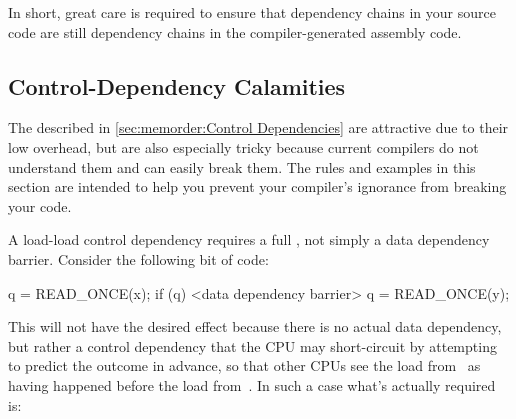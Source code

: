 \QuickQuizEnd

In short, great care is required to ensure that dependency
chains in your source code are still dependency chains in the
compiler-generated assembly code.

\subsection{Control-Dependency Calamities}
\label{sec:memorder:Control-Dependency Calamities}

The  described in
\cref{sec:memorder:Control Dependencies}
are attractive due to their low overhead, but are also especially
tricky because current compilers do not understand them and can easily
break them.
The rules and examples in this section are intended to help you
prevent your compiler's ignorance from breaking your code.

A load-load control dependency requires a full ,
not simply a data dependency barrier.
Consider the following bit of code:

\begin{VerbatimN}
q = READ_ONCE(x);
if (q) {
	<data dependency barrier>
	q = READ_ONCE(y);
}
\end{VerbatimN}

This will not have the desired effect because there is no actual data
dependency, but rather a control dependency that the CPU may short-circuit
by attempting to predict the outcome in advance, so that other CPUs see
the load from~ as having happened before the load from~.
In such a case what's actually required is:

